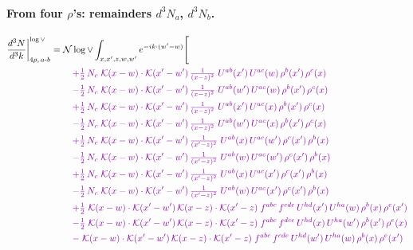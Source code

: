 \documentclass[10pt]{article}
\numberwithin{equation}{section}
\newcommand{\NNv}{\mathcal N\log\vee}
\begin{document}
\paragraph{From four $\rho$'s: remainders $d^3N_a$, $d^3N_b$.}
\begin{align}
\frac{d^3N}{d^3k}\bigg|^{\log\vee}_{4\rho,\,a\text{-}b}={}&\NNv\int_{x,x',z,w,w'}e^{-ik\cdot(w'-w)}\Bigg[\notag\\
&\quad{\color{CC}+\tfrac{1}{2}\,N_c\;\mathcal{K}(x-w)\cdot\mathcal{K}(x'-w')\,\tfrac{1}{(x-z)^{2}}\;U^{ab}(x')\,U^{ac}(w)\,\rho^{b}(x')\,\rho^{c}(x)}\notag\\
&\quad{\color{CC}-\tfrac{1}{2}\,N_c\;\mathcal{K}(x-w)\cdot\mathcal{K}(x'-w')\,\tfrac{1}{(x-z)^{2}}\;U^{ab}(w')\,U^{ac}(w)\,\rho^{b}(x')\,\rho^{c}(x)}\notag\\
&\quad{\color{CC}+\tfrac{1}{2}\,N_c\;\mathcal{K}(x-w)\cdot\mathcal{K}(x'-w')\,\tfrac{1}{(x-z)^{2}}\;U^{ab}(x')\,U^{ac}(x)\,\rho^{b}(x')\,\rho^{c}(x)}\notag\\
&\quad{\color{CC}-\tfrac{1}{2}\,N_c\;\mathcal{K}(x-w)\cdot\mathcal{K}(x'-w')\,\tfrac{1}{(x-z)^{2}}\;U^{ab}(w')\,U^{ac}(x)\,\rho^{b}(x')\,\rho^{c}(x)}\notag\\
&\quad{\color{CC}+\tfrac{1}{2}\,N_c\;\mathcal{K}(x-w)\cdot\mathcal{K}(x'-w')\,\tfrac{1}{(x'-z)^{2}}\;U^{ab}(x)\,U^{ac}(w')\,\rho^{c}(x')\,\rho^{b}(x)}\notag\\
&\quad{\color{CC}-\tfrac{1}{2}\,N_c\;\mathcal{K}(x-w)\cdot\mathcal{K}(x'-w')\,\tfrac{1}{(x'-z)^{2}}\;U^{ab}(w)\,U^{ac}(w')\,\rho^{c}(x')\,\rho^{b}(x)}\notag\\
&\quad{\color{CC}+\tfrac{1}{2}\,N_c\;\mathcal{K}(x-w)\cdot\mathcal{K}(x'-w')\,\tfrac{1}{(x'-z)^{2}}\;U^{ab}(x)\,U^{ac}(x')\,\rho^{c}(x')\,\rho^{b}(x)}\notag\\
&\quad{\color{CC}-\tfrac{1}{2}\,N_c\;\mathcal{K}(x-w)\cdot\mathcal{K}(x'-w')\,\tfrac{1}{(x'-z)^{2}}\;U^{ab}(w)\,U^{ac}(x')\,\rho^{c}(x')\,\rho^{b}(x)}\notag\\
&\quad{\color{CC}+\tfrac{1}{2}\;\mathcal{K}(x-w)\cdot\mathcal{K}(x'-w')\,\mathcal{K}(x-z)\cdot\mathcal{K}(x'-z)\;f^{abc}\,f^{cde}\,U^{hd}(x')\,U^{ha}(w)\,\rho^{b}(x)\,\rho^{e}(x')}\notag\\
&\quad{\color{CC}-\tfrac{1}{2}\;\mathcal{K}(x-w)\cdot\mathcal{K}(x'-w')\,\mathcal{K}(x-z)\cdot\mathcal{K}(x'-z)\;f^{abc}\,f^{dce}\,U^{hd}(x)\,U^{ha}(w')\,\rho^{b}(x')\,\rho^{e}(x)}\notag\\
&\quad{\color{CC}-\;\mathcal{K}(x-w)\cdot\mathcal{K}(x'-w')\,\mathcal{K}(x-z)\cdot\mathcal{K}(x'-z)\;f^{abc}\,f^{cde}\,U^{hd}(w')\,U^{ha}(w)\,\rho^{b}(x)\,\rho^{e}(x')}\notag\\

\end{align}
\end{document}
